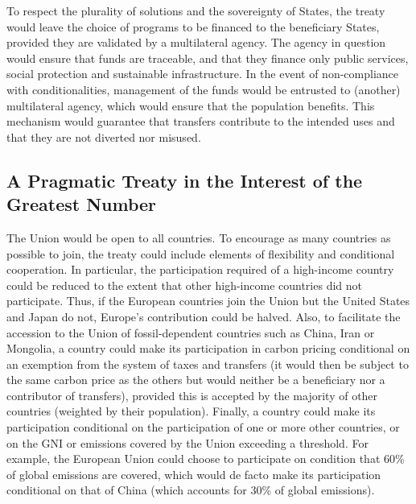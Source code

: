 \documentclass[12pt,english]{article}
\begin{document}
\begin{bibunit}
To respect the plurality of solutions and the sovereignty of States, the treaty would leave the choice of programs to be financed to the beneficiary States, provided they are validated by a multilateral agency. The agency in question would ensure that funds are traceable, and that they finance only public services, social protection and sustainable infrastructure. In the event of non-compliance with conditionalities, management of the funds would be entrusted to (another) multilateral agency, which would ensure that the population benefits. This mechanism would guarantee that transfers contribute to the intended uses and that they are not diverted nor misused.

\subsection*{A Pragmatic Treaty in the Interest of the Greatest Number}
The Union would be open to all countries. To encourage as many countries as possible to join, the treaty could include elements of flexibility and conditional cooperation. In particular, the participation required of a high-income country could be reduced to the extent that other high-income countries did not participate. Thus, if the European countries join the Union but the United States and Japan do not, Europe's contribution could be halved. Also, to facilitate the accession to the Union of fossil-dependent countries such as China, Iran or Mongolia, a country could make its participation in carbon pricing conditional on an exemption from the system of taxes and transfers (it would then be subject to the same carbon price as the others but would neither be a beneficiary nor a contributor of transfers), provided this is accepted by the majority of other countries (weighted by their population). Finally, a country could make its participation conditional on the participation of one or more other countries, or on the GNI or emissions covered by the Union exceeding a threshold. For example, the European Union could choose to participate on condition that 60\% of global emissions are covered, which would de facto make its participation conditional on that of China (which accounts for 30\% of global emissions).


\end{bibunit}
\end{document}
